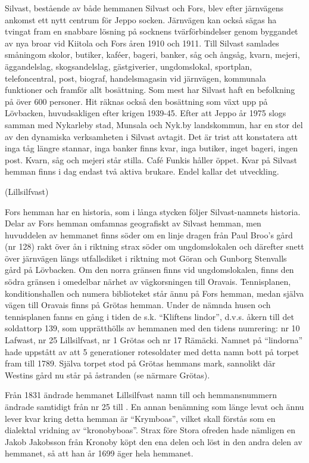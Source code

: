 Silvast, bestående av både hemmanen Silvast och Fors, blev efter järnvägens ankomst ett nytt centrum för Jeppo socken. Järnvägen kan också sägas ha tvingat fram en snabbare lösning på socknens tvärförbindelser genom byggandet av nya broar vid Kiitola och Fors åren 1910 och 1911. Till Silvast samlades småningom skolor, butiker, kaféer, bageri, banker, såg och ångsåg, kvarn, mejeri, äggandelslag, skogsandelslag, gästgiverier, ungdomslokal, sportplan, telefoncentral, post, biograf, handelsmagasin vid järnvägen, kommunala funktioner och framför allt bosättning. Som mest har Silvast haft en befolkning på över 600 personer. Hit räknas också den bosättning som växt upp på Lövbacken, huvudsakligen efter krigen 1939-45. Efter att Jeppo år 1975 slogs samman med Nykarleby stad, Munsala och Nyk.by landskommun, har en stor del av den dynamiska verksamheten i  Silvast avtagit. Det är trist att konstatera att inga tåg längre stannar, inga banker finns kvar, inga butiker, inget bageri, ingen post. Kvarn, såg och mejeri står stilla. Café Funkis håller öppet. Kvar på Silvast hemman finns i dag endast två aktiva brukare. Endel kallar det utveckling.


  (Lillsilfvast)

Fors hemman har en historia, som i långa stycken följer Silvast-namnets historia. Delar av Fors hemman omfamnas geografiskt av Silvast hemman, men huvuddelen av hemmanet finns söder om en linje dragen från Paul Broo's gård (nr 128) rakt över ån i riktning strax söder om ungdomslokalen och därefter snett över järnvägen längs utfallsdiket i riktning mot Göran och Gunborg Stenvalls gård på Lövbacken. Om den norra gränsen finns vid ungdomslokalen, finns den södra gränsen i omedelbar närhet av vägkorsningen till Oravais. Tennisplanen, konditionshallen och numera biblioteket står ännu på Fors hemman, medan själva vägen till Oravais finns på Grötas hemman. Under de nämnda husen och tennisplanen fanns en gång i tiden de s.k. ``Kliftens lindor'', d.v.s. åkern till det soldattorp 139, som upprätthölls av hemmanen med den tidens numrering: nr 10 Lafwast, nr 25 Lillsilfvast, nr 1 Grötas och nr 17 Rämäcki. Namnet på ``lindorna'' hade uppstått av att 5 generationer rotesoldater med detta namn bott på torpet fram till 1789. Själva torpet stod på Grötas hemmans mark, sannolikt där Westins gård nu står på åstranden (se närmare Grötas).

Från 1831 ändrade hemmanet Lillsilfvast namn till  och hemmansnummern ändrade samtidigt från nr 25  till . En annan benämning som länge levat och ännu lever kvar kring detta hemman är ``Krymboas'', vilket skall förstås som en dialektal vridning  av ``kronobyboas''. Strax före Stora ofreden hade nämligen en Jakob Jakobsson från Kronoby köpt den ena delen och löst in den andra delen av hemmanet, så att han år 1699 äger hela hemmanet.

